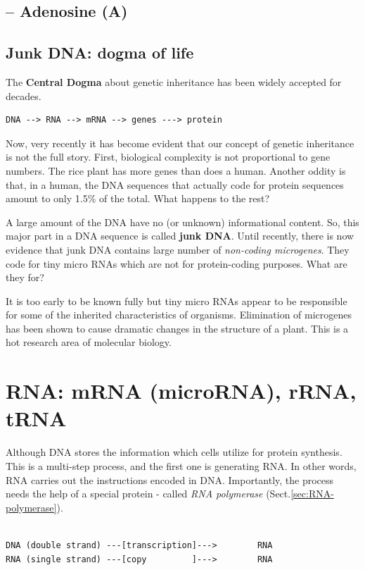 \subsection{-- Adenosine (A)}
\label{sec:adenosine}



\subsection{Junk DNA: dogma of life}
\label{sec:junk-dna}


The {\bf Central Dogma} about genetic inheritance has been widely
accepted for decades. 
\begin{verbatim}
DNA --> RNA --> mRNA --> genes ---> protein 
\end{verbatim}

Now, very recently it has become evident that our concept of genetic inheritance
is not the full story. First, biological complexity is not proportional to gene
numbers. The rice plant has more genes than does a human. Another oddity is
that, in a human, the DNA sequences that actually code for protein sequences
amount to only 1.5\% of the total. What happens to the rest?

A large amount of the DNA have no (or unknown) informational
content. So, this major part in a DNA sequence is called
{\bf junk DNA}. Until recently, there is now evidence that junk DNA
contains large number of {\it non-coding microgenes}. They code for
tiny micro RNAs which are not for protein-coding purposes. What are
they for?

It is too early to be known fully but tiny micro RNAs appear to be
responsible for some of the inherited characteristics of
organisms. Elimination of microgenes has been shown to cause dramatic
changes in the structure of a plant. This is a hot research area of
molecular biology.


\section{RNA: mRNA (microRNA), rRNA, tRNA}
\label{sec:RNA}

Although DNA stores the information which cells utilize for protein synthesis.
This is a multi-step process, and the first one is generating RNA. In other
words, RNA carries out the instructions encoded in DNA. Importantly, the
process needs the help of a special protein - called {\it RNA polymerase}
(Sect.\ref{sec:RNA-polymerase}).

\begin{verbatim}

DNA (double strand) ---[transcription]--->        RNA
RNA (single strand) ---[copy         ]--->        RNA
\end{verbatim}

